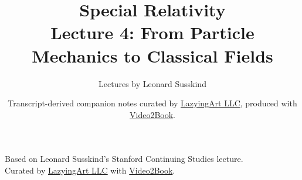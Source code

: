 \documentclass[11pt,oneside]{book}
\begin{document}
\frontmatter
\title{Special Relativity\\Lecture 4: From Particle Mechanics to Classical Fields}
\author{Lectures by Leonard Susskind}
\date{Transcript-derived companion notes curated by \href{https://lazying.art}{LazyingArt LLC}, produced with \href{https://github.com/lachlanchen/Video2Book}{Video2Book}.}
\maketitle
\setcounter{page}{2}
\begin{center}
\small Based on Leonard Susskind's Stanford Continuing Studies lecture.\\
Curated by \href{https://lazying.art}{LazyingArt LLC} with \href{https://github.com/lachlanchen/Video2Book}{Video2Book}.
\end{center}
\clearpage
\mainmatter

\end{document}
